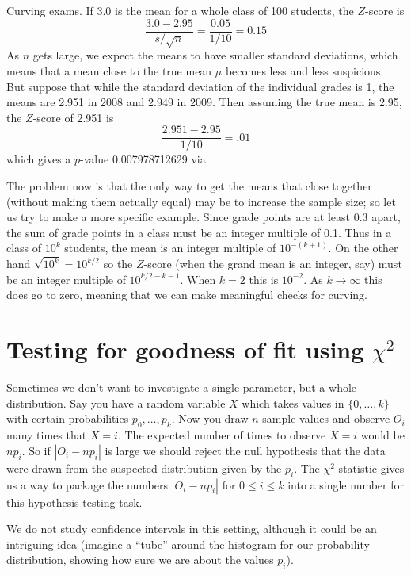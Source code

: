 \begin{example}{Curving exams.}
If 3.0 is the mean for a whole class of 100 students, the $Z$-score is
\[
	\frac{3.0-2.95}{s/\sqrt{n}} = \frac{0.05}{1/10} = 0.15
\]
As $n$ gets large, we expect the means to have smaller standard deviations, which means that a mean close to the true mean $\mu$ becomes less and less suspicious.
But suppose that while the standard deviation of the individual grades is 1, the means are 2.951 in 2008 and 2.949 in 2009.
Then assuming the true mean is 2.95, the $Z$-score of 2.951 is
\[
	\frac{2.951-2.95}{1/10} = .01
\]
which gives a $p$-value 0.007978712629 via


The problem now is that the only way to get the means that close together (without making them actually equal) may be to increase the sample size; so let us try to make a more specific example.
Since grade points are at least 0.3 apart, the sum of grade points in a class must be an integer multiple of 0.1. Thus in a class of $10^k$ students, the mean is an integer multiple of $10^{-(k+1)}$.
On the other hand $\sqrt{10^k}=10^{k/2}$ so the $Z$-score (when the grand mean is an integer, say) must be an integer multiple of $10^{k/2-k-1}$. When $k=2$ this is $10^{-2}$. As $k\to\infty$ this does go to zero, meaning that we can make meaningful checks for curving.
\end{example}


\section{Testing for goodness of fit using \texorpdfstring{$\chi^2$}{chi-square}}
\label{oneWayChiSquare}


Sometimes we don't want to investigate a single parameter, but a whole distribution. Say you have a random variable $X$ which takes values in $\{0,\dots,k\}$ with certain probabilities $p_0,\dots,p_k$.
Now you draw $n$ sample values and observe $O_i$ many times that $X=i$. The expected number of times to observe $X=i$ would be $np_i$. So if $|O_i-np_i|$ is large we should reject the null hypothesis that the data were drawn from the suspected distribution given by the $p_i$. The $\chi^2$-statistic gives us a way to package the numbers $|O_i-np_i|$ for $0\le i\le k$ into a single number for this hypothesis testing task.

We do not study confidence intervals in this setting, although it could be an intriguing idea (imagine a ``tube'' around the histogram for our probability distribution, showing how sure we are about the values $p_i$).


